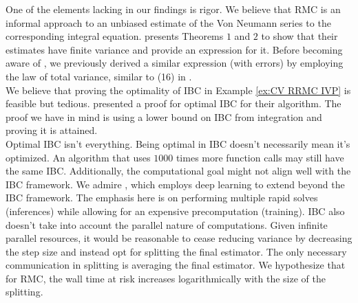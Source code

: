 \documentclass[a4paper,12pt]{article}
\begin{document}
One of the elements lacking in our findings is rigor.  We believe
that RMC is an informal approach to an unbiased estimate of
the Von Neumann series to the corresponding integral equation.
\cite{ermakov_monte_2021} presents Theorems $1$ and $2$ to
show that their estimates have finite variance and provide an expression for it.
Before becoming aware of \cite{ermakov_monte_2021}, we
previously derived a similar expression (with errors)
by employing the law of total variance, similar to (16) in \cite{rath_ears_2022}. \\
We believe that proving the optimality of IBC in Example \ref{ex:CV RRMC IVP} is feasible
but tedious.
\cite{daun_randomized_2011} presented a proof for optimal IBC for their algorithm.
The proof we have in mind is using a lower bound on IBC
from integration and proving it is attained.\\

Optimal IBC isn't everything. Being optimal in IBC doesn't necessarily mean it's optimized.
An algorithm that uses $1000$ times more function calls may still have the same
IBC. Additionally, the computational goal
might not align well with the IBC framework.
We admire \cite{becker_learning_2022},
which employs deep learning to extend beyond the IBC framework.
The emphasis here is on performing multiple rapid solves (inferences)
while allowing for an expensive precomputation (training).
IBC also doesn't take into account the parallel nature of computations.
Given infinite parallel resources, it would be reasonable to cease reducing
variance by decreasing the step size and instead opt for splitting the final estimator.
The only necessary communication in splitting is averaging the final
estimator. We hypothesize that for RMC, the wall time at risk
increases logarithmically with the size of the splitting.



\newpage
\begin{abstract}
  
\end{abstract}

\printbibliography
\newpage
\end{document}
